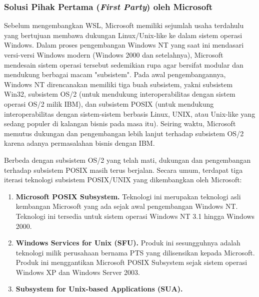 \subsubsection{Solusi Pihak Pertama (\textit{First Party}) oleh Microsoft}

Sebelum mengembangkan WSL, Microsoft memiliki sejumlah usaha terdahulu yang bertujuan membawa dukungan Linux/Unix-like ke dalam sistem operasi Windows. Dalam proses pengembangan Windows NT yang saat ini mendasari versi-versi Windows modern (Windows 2000 dan setelahnya), Microsoft mendesain sistem operasi tersebut sedemikian rupa agar bersifat modular dan mendukung berbagai macam "subsistem". Pada awal pengembangannya, Windows NT direncanakan memiliki tiga buah subsistem, yakni subsistem Win32, subsistem OS/2 (untuk mendukung interoperabilitas dengan sistem operasi OS/2 milik IBM), dan subsistem POSIX (untuk mendukung interoperabilitas dengan sistem-sistem berbasis Linux, UNIX, atau Unix-like yang sedang populer di kalangan bisnis pada masa itu). Seiring waktu, Microsoft memutus dukungan dan pengembangan lebih lanjut terhadap subsistem OS/2 karena adanya permasalahan bisnis dengan IBM.

Berbeda dengan subsistem OS/2 yang telah mati, dukungan dan pengembangan terhadap subsistem POSIX masih terus berjalan. Secara umum, terdapat tiga iterasi teknologi subsistem POSIX/UNIX yang dikembangkan oleh Microsoft:

\begin{enumerate}
    \item \textbf{Microsoft POSIX Subsystem.} Teknologi ini merupakan teknologi asli kembangan Microsoft yang ada sejak awal pengembangan Windows NT. Teknologi ini tersedia untuk sistem operasi Windows NT 3.1 hingga Windows 2000.
    \item \textbf{Windows Services for Unix (SFU).} Produk ini sesungguhnya adalah teknologi milik perusahaan bernama PTS yang dilisensikan kepada Microsoft. Produk ini menggantikan Microsoft POSIX Subsystem sejak sistem operasi Windows XP dan Windows Server 2003.
    \item \textbf{Subsystem for Unix-based Applications (SUA).}
\end{enumerate}

